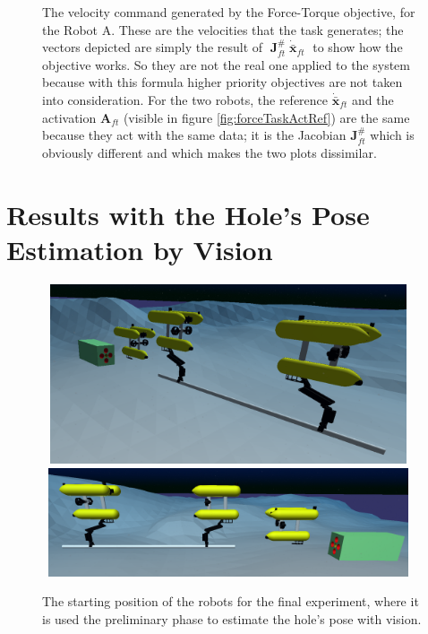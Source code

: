 \begin{figure}[H]
	\caption[Plots of the velocity command generated by the Force-Torque objective]{The velocity command generated by the Force-Torque objective, for the Robot A. These are the velocities that the task generates; the vectors depicted are simply the result of $\; \boldsymbol{J}^{\#}_{ft} \; \dot{\bar{\boldsymbol{x}}}_{ft}\;$ to show how the objective works. So they are not the real one applied to the system because with this formula higher priority objectives are not taken into consideration. For the two robots, the reference $\dot{\bar{\boldsymbol{x}}}_{ft}$ and the activation $\boldsymbol{A}_{ft}$ (visible in figure \ref{fig:forceTaskActRef}) are the same because they act with the same data; it is the Jacobian $\boldsymbol{J}^{\#}_{ft}$ which is obviously different and which makes the two plots dissimilar.}
	\label{fig:forceTaskVelocities}
\end{figure}


\section{Results with the Hole's Pose Estimation by Vision}
\label{sec:finalTest}
\begin{figure}[H]
	\centering
	\includegraphics[width=11cm, height=5.3cm]{uwsim_scenario_all0.png}
	\includegraphics[width=11cm, height=3.2cm]{uwsim_scenario_all1.png}
	
	\caption[Scenario for the final test with Vision]{The starting position of the robots for the final experiment, where it is used the preliminary phase to estimate the hole's pose with vision.}
	\label{fig:uwsim_expAll}
\end{figure}

